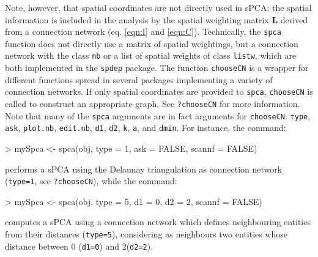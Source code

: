 \documentclass{article}
\newcommand{\m}[1]{\mathbf{#1}}
\begin{document}
Note, however, that spatial coordinates are not directly used in sPCA:
the spatial information is included in the analysis by the spatial
weighting matrix $\m{L}$ derived from a connection network (eq. \ref{eqn:I} and \ref{eqn:C}).
Technically, the \texttt{spca} function does not directly use a
matrix of spatial weightings, but a connection network with the class
\texttt{nb} or a list of spatial weights of class \texttt{listw},
which are both implemented in the \texttt{spdep} package.
The function \texttt{chooseCN} is a wrapper for different functions
spread in several packages implementing a variety of connection networks.
If only spatial coordinates are provided to \texttt{spca},
\texttt{chooseCN} is called to construct an appropriate graph.
See \texttt{?chooseCN} for more information.
Note that many of the \texttt{spca} arguments are in fact arguments
for \texttt{chooseCN}: \texttt{type}, \texttt{ask}, \texttt{plot.nb},
\texttt{edit.nb}, \texttt{d1}, \texttt{d2}, \texttt{k}, \texttt{a}, and \texttt{dmin}.
For instance, the command:
\begin{Schunk}
\begin{Sinput}
> mySpca <- spca(obj, type = 1, ask = FALSE, scannf = FALSE)
\end{Sinput}
\end{Schunk}
\noindent performs a sPCA using the Delaunay triangulation as
connection network (\texttt{type=1}, see \texttt{?chooseCN}), while
the command:
\begin{Schunk}
\begin{Sinput}
> mySpca <- spca(obj, type = 5, d1 = 0, d2 = 2, scannf = FALSE)
\end{Sinput}
\end{Schunk}
\noindent computes a sPCA using a connection network which defines
neighbouring entities from their distances (\texttt{type=5}),
considering as neighbours two entities whose distance between 0 (\texttt{d1=0}) and 2(\texttt{d2=2}).
\\
\end{document}
